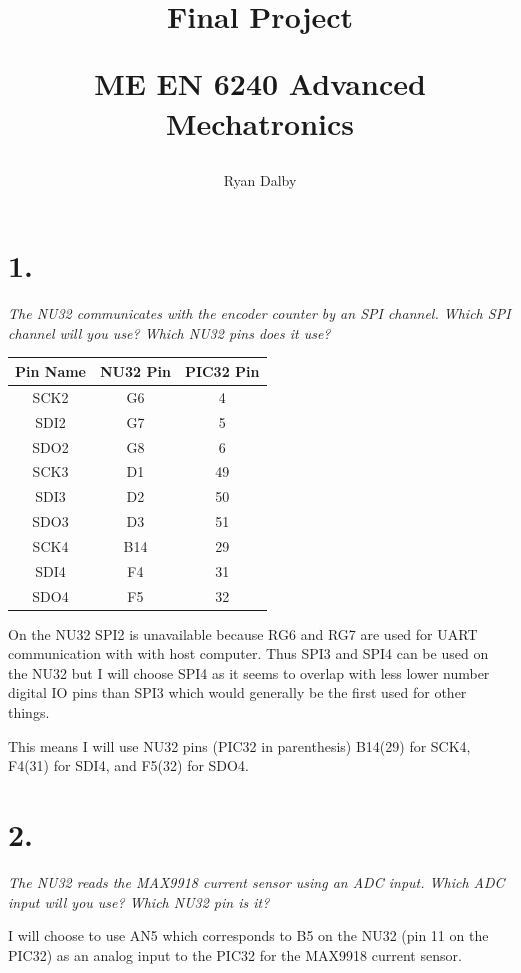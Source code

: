 \documentclass[12pt]{article}
\title{
    Final Project

    \large{
        ME EN 6240 Advanced Mechatronics
    }  
}
\author{
        Ryan Dalby
}
\date{\displaydate{date}}
\begin{document}
\maketitle

\section*{1.}
\textit{The NU32 communicates with the encoder counter by an SPI channel. Which SPI channel will you use? Which NU32 pins does it use?}

\begin{center}
\begin{tabular}{|c|c|c|}
    \hline
    Pin Name & NU32 Pin & PIC32 Pin \\
    \hline
    SCK2 & G6 & 4\\
    SDI2 & G7 & 5\\
    SDO2 & G8 & 6\\
    \hline
    SCK3 & D1 & 49\\
    SDI3 & D2 & 50\\
    SDO3 & D3 & 51\\
    \hline
    SCK4 & B14 & 29\\
    SDI4 & F4 & 31\\
    SDO4 & F5 & 32\\
    \hline
\end{tabular}
\end{center}

On the NU32 SPI2 is unavailable because RG6 and RG7 are used for UART communication with with host computer.
Thus SPI3 and SPI4 can be used on the NU32 but I will choose SPI4 as it seems to overlap with less lower number digital IO pins than SPI3 which would generally be the first used for other things.

This means I will use NU32 pins (PIC32 in parenthesis) B14(29) for SCK4, F4(31) for SDI4, and F5(32) for SDO4.



\section*{2.}
\textit{The NU32 reads the MAX9918 current sensor using an ADC input. Which ADC input will you use? Which NU32 pin is it?}

I will choose to use AN5 which corresponds to B5 on the NU32 (pin 11 on the PIC32) as an analog input to the PIC32 for the MAX9918 current sensor.
\end{document}
